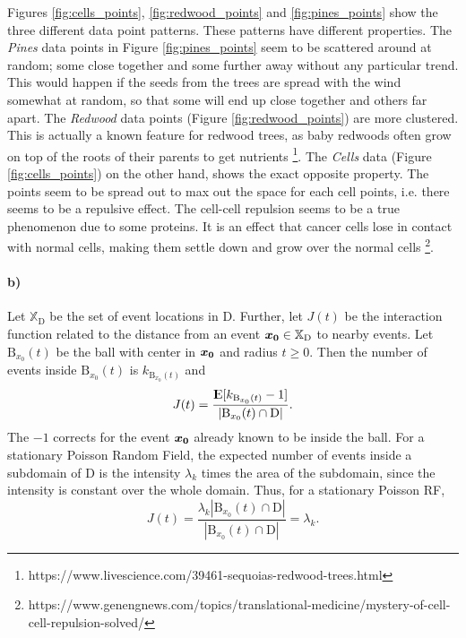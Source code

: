Figures \ref{fig:cells_points}, \ref{fig:redwood_points} and \ref{fig:pines_points} show the three different data point patterns. These patterns have different properties. The \textit{Pines} data points in Figure \ref{fig:pines_points} seem to be scattered around at random; some close together and some further away without any particular trend. This would happen if the seeds from the trees are spread with the wind somewhat at random, so that some will end up close together and others far apart. The \textit{Redwood} data points (Figure \ref{fig:redwood_points}) are more clustered. This is actually a known feature for redwood trees, as baby redwoods often grow on top of the roots of their parents to get nutrients \footnote{https://www.livescience.com/39461-sequoias-redwood-trees.html}. The \textit{Cells} data (Figure \ref{fig:cells_points}) on the other hand, shows the exact opposite property. The points seem to be spread out to max out the space for each cell points, i.e. there seems to be a repulsive effect. The cell-cell repulsion seems to be a true phenomenon due to some proteins. It is an effect that cancer cells lose in contact with normal cells, making them settle down and grow over the normal cells \footnote{https://www.genengnews.com/topics/translational-medicine/mystery-of-cell-cell-repulsion-solved/}.

\paragraph{b)}

Let $\mathbb{X}_{\textrm{D}}$ be the set of event locations in $\textrm{D}$. Further, let $J(t)$ be the interaction function related to the distance from an event $\bm{x_0} \in \mathbb{X}_{\textrm{D}}$ to nearby events. Let $\textrm{B}_{x_0}(t)$ be the ball with center in $\bm{x_0}$ and radius $t \geq 0$. Then the number of events inside $\textrm{B}_{x_0}(t)$ is $k_{\textrm{B}_{x_0}(t)}$ and
\begin{equation}
    J(t) = \frac{{\rm I\kern-.3em E}{[k_{\textrm{B}_{x_0}(t)}-1]}}{|\textrm{B}_{x_0}(t) \cap \textrm{D}|}.
\end{equation}
The $-1$ corrects for the event $\bm{x_0}$ already known to be inside the ball. For a stationary Poisson Random Field, the expected number of events inside a subdomain of D is the intensity $\lambda_k$ times the area of the subdomain, since the intensity is constant over the whole domain. Thus, for a stationary Poisson RF, 
\begin{equation}
    J(t) = \frac{\lambda_k |\textrm{B}_{x_0}(t) \cap \textrm{D}|}{|\textrm{B}_{x_0}(t) \cap \textrm{D}|} = \lambda_k.
\end{equation}

